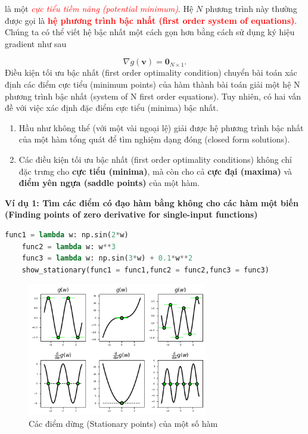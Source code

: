 \documentclass{book}
\begin{document}
là một \textit{\textcolor{red}{cực tiểu tiềm năng (potential minimum)}}. Hệ $N$ phương trình này thường được gọi là \textbf{\textcolor{red}{hệ phương trình bậc nhất (first order system of equations)}}. Chúng ta có thể viết hệ bậc nhất một cách gọn hơn bằng cách sử dụng ký hiệu gradient như sau

\begin{equation}
\nabla g\left(\mathbf{v}\right)=\mathbf{0}_{N\times1}.
\end{equation}
Điều kiện tối ưu bậc nhất (first order optimality condition) chuyển bài toán xác định các điểm cực tiểu (minimum points) của hàm thành bài toán giải một hệ N phương trình bậc nhất (system of N first order equations).
Tuy nhiên, có hai vấn đề với việc xác định đặc điểm cực tiểu (minima) bậc nhất.
\begin{enumerate}
    \item Hầu như không thể (với một vài ngoại lệ) giải được hệ phương trình bậc nhất của một hàm tổng quát để tìm nghiệm dạng đóng (closed form solutions).
    \item Các điều kiện tối ưu bậc nhất (first order optimality conditions) không chỉ đặc trưng cho \textbf{cực tiểu (minima)}, mà còn cho cả \textbf{cực đại (maxima)} và \textbf{điểm yên ngựa (saddle points)} của một hàm.
\end{enumerate}
\textbf{Ví dụ 1: Tìm các điểm có đạo hàm bằng không cho các hàm một biến (Finding points of zero derivative for single-input functions)}
\begin{lstlisting}[language=Python, caption={Snippet of python code to show stationary points tangent lines}, label={code:stationary_points}]
    func1 = lambda w: np.sin(2*w)
    func2 = lambda w: w**3
    func3 = lambda w: np.sin(3*w) + 0.1*w**2
    show_stationary(func1 = func1,func2 = func2,func3 = func3)
\end{lstlisting}
\begin{figure}[H]
    \centering
    \includegraphics[width=0.7\textwidth]{images/stationary_points.png}
    \caption{Các điểm dừng (Stationary points) của một số hàm}
    \label{fig:stationry_points}
\end{figure}
\end{document}
